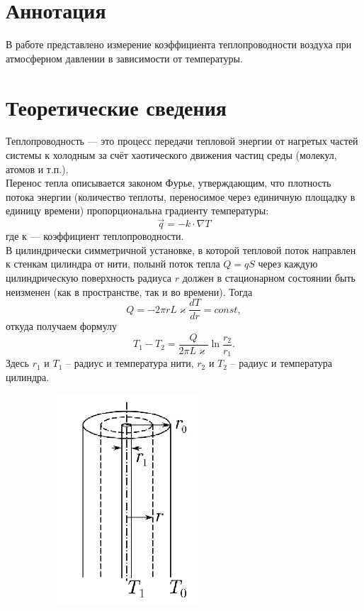 \documentclass[a4paper,12pt]{article} %
\begin{document}
\section{Аннотация}
В работе представлено измерение коэффициента теплопроводности воздуха при атмосферном давлении в зависимости от температуры.
\section{Теоретические сведения}
Теплопроводность — это процесс передачи тепловой энергии от нагретых частей системы к холодным за счёт хаотического движения частиц среды (молекул, атомов и т.п.). \\
Перенос тепла описывается законом Фурье, утверждающим, что плотность потока энергии (количество теплоты, переносимое через единичную площадку в единицу времени) пропорциональна градиенту температуры:
\begin{equation}
    \Vec{q} = -k \cdot \nabla T
\end{equation}
где к — коэффициент теплопроводности. \\
В цилиндрически симметричной установке, в которой тепловой поток направлен к стенкам цилиндра от нити, полынй поток тепла $Q = qS$ через каждую цилиндрическую поверхность радиуса $r$ должен в стационарном состоянии быть неизменен (как в пространстве, так и во времени). Тогда
\begin{equation}
	Q = -2\pi rL\varkappa \frac{dT}{dr} = const,	
\end{equation}
откуда получаем формулу
\begin{equation}
	\label{formula}
	T_1 - T_2 = \frac{Q}{2\pi L\varkappa} \ln \frac{r_2}{r_1}.
\end{equation}
Здесь $r_1$ и $T_1$ -- радиус и температура нити, $r_2$ и $T_2$ -- радиус и температура цилиндра.

\begin{figure}[h!]
\begin{floatrow}
         {\includegraphics[width=7cm,height=7.875cm]{physlabwork_11week_th.png}}     
\end{floatrow}
\end{figure}
\end{document}
